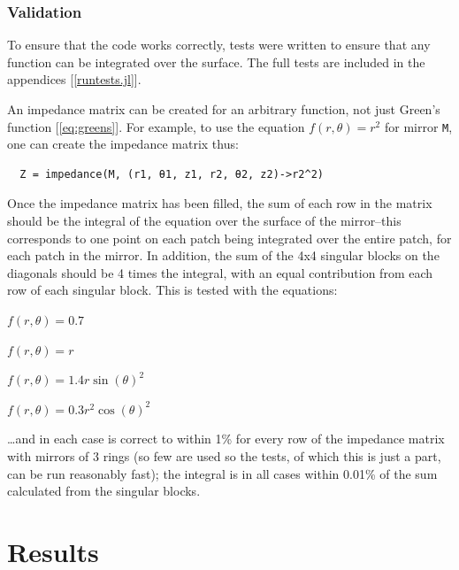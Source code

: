 \documentclass[etd,twoside,senior,noacknowledgments]{BYUPhys}
\begin{document}
\subsection{Validation} \label{sec:validation}

To ensure that the code works correctly, tests were written to ensure that any function can be integrated over the surface. The full tests are included in the appendices [\ref{runtests.jl}].

An impedance matrix can be created for an arbitrary function, not just Green's function [\ref{eq:greens}]. For example, to use the equation $f\left(r, \theta\right) = r^2$ for mirror \texttt{M}, one can create the impedance matrix thus:

\begin{verbatim}
  Z = impedance(M, (r1, θ1, z1, r2, θ2, z2)->r2^2)
\end{verbatim}

Once the impedance matrix has been filled, the sum of each row in the matrix should be the integral of the equation over the surface of the mirror--this corresponds to one point on each patch being integrated over the entire patch, for each patch in the mirror. In addition, the sum of the 4x4 singular blocks on the diagonals should be 4 times the integral, with an equal contribution from each row of each singular block. This is tested with the equations:

$f\left(r, \theta\right) = 0.7$

$f\left(r, \theta\right) = r$

$f\left(r, \theta\right) = 1.4 r \sin\left(\theta\right)^2$

$f\left(r, \theta\right) = 0.3 r^2 \cos\left(\theta\right)^2$

\ldots and in each case is correct to within 1\% for every row of the impedance matrix with mirrors of 3 rings (so few are used so the tests, of which this is just a part, can be run reasonably fast); the integral is in all cases within 0.01\% of the sum calculated from the singular blocks.







\chapter{Results}\label{chap:results}
\end{document}
